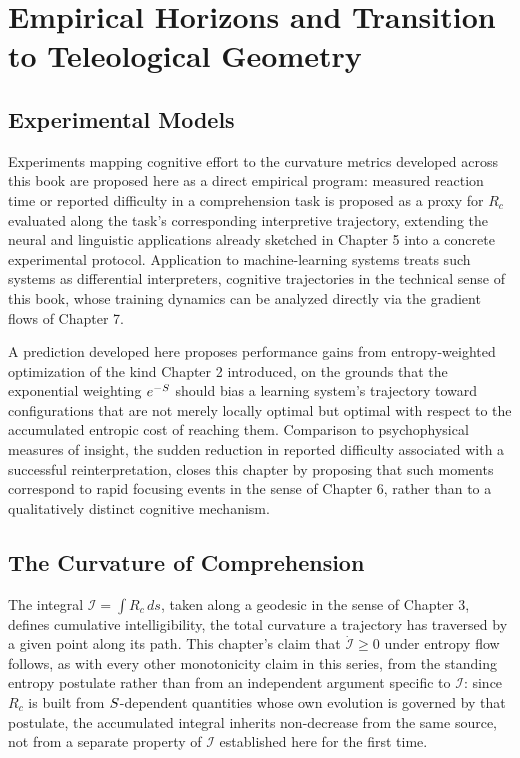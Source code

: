 \part{Empirical Horizons and Transition to Teleological Geometry}

\chapter{Experimental Models}

Experiments mapping cognitive effort to the curvature metrics developed across this book are proposed here as a direct empirical program: measured reaction time or reported difficulty in a comprehension task is proposed as a proxy for $R_c$ evaluated along the task's corresponding interpretive trajectory, extending the neural and linguistic applications already sketched in Chapter 5 into a concrete experimental protocol. Application to machine-learning systems treats such systems as differential interpreters, cognitive trajectories in the technical sense of this book, whose training dynamics can be analyzed directly via the gradient flows of Chapter 7.

A prediction developed here proposes performance gains from entropy-weighted optimization of the kind Chapter 2 introduced, on the grounds that the exponential weighting $e^{-S}$ should bias a learning system's trajectory toward configurations that are not merely locally optimal but optimal with respect to the accumulated entropic cost of reaching them. Comparison to psychophysical measures of insight, the sudden reduction in reported difficulty associated with a successful reinterpretation, closes this chapter by proposing that such moments correspond to rapid focusing events in the sense of Chapter 6, rather than to a qualitatively distinct cognitive mechanism.

\chapter{The Curvature of Comprehension}

The integral $\mathcal{I} = \int R_c \, ds$, taken along a geodesic in the sense of Chapter 3, defines cumulative intelligibility, the total curvature a trajectory has traversed by a given point along its path. This chapter's claim that $\dot{\mathcal{I}} \geq 0$ under entropy flow follows, as with every other monotonicity claim in this series, from the standing entropy postulate rather than from an independent argument specific to $\mathcal{I}$: since $R_c$ is built from $S$-dependent quantities whose own evolution is governed by that postulate, the accumulated integral inherits non-decrease from the same source, not from a separate property of $\mathcal{I}$ established here for the first time.

